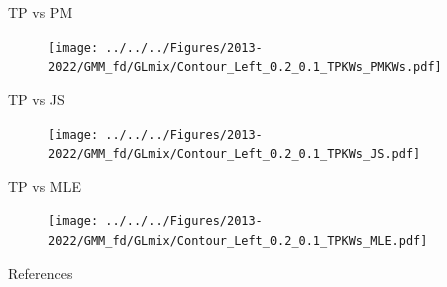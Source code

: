 \documentclass[10pt, aspectratio=169]{beamer}
\begin{document}
\begin{frame}[label=tpcontour]{TP vs PM}
  \begin{figure}
    \centering
    \texttt{[image: ../../../Figures/2013-2022/GMM\_fd/GLmix/Contour\_Left\_0.2\_0.1\_TPKWs\_PMKWs.pdf]}
  \end{figure}
  \hyperlink{tpselect}{}
\end{frame}

\begin{frame}{TP vs JS}
  \begin{figure}
    \centering
    \texttt{[image: ../../../Figures/2013-2022/GMM\_fd/GLmix/Contour\_Left\_0.2\_0.1\_TPKWs\_JS.pdf]}
  \end{figure}
\end{frame}

\begin{frame}{TP vs MLE}
  \begin{figure}
    \centering
    \texttt{[image: ../../../Figures/2013-2022/GMM\_fd/GLmix/Contour\_Left\_0.2\_0.1\_TPKWs\_MLE.pdf]}
  \end{figure}
\end{frame}

\begin{frame}[allowframebreaks]{References}

  
  

\end{frame}
\end{document}
